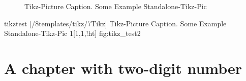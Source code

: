 \np
%
\begin{figure}[!htpb]
    \centering
    \caption{Tikz-Picture Caption. Some Example Standalone-Tikz-Pic}
    \label{fig:tikz_test}
\end{figure}
%
%
\tikzabb%
{tikztest}%
[\DenKrLayoutMainRootDir/8templates/tikz/7Tikz]%
{%
Tikz-Picture Caption. Some Example Standalone-Tikz-Pic
}%
{1}[1,1,!ht]%
{fig:tikz_test2}%
%
%



\setcounter{chapter}{9}
\chapter{A chapter with two-digit number}